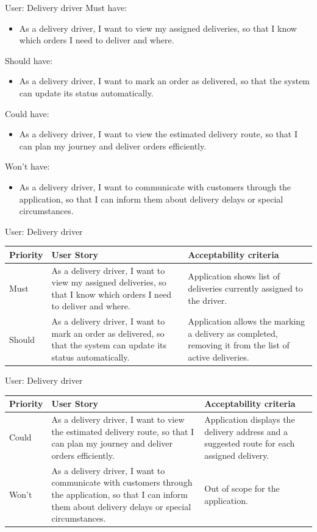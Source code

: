\documentclass{beamer}
\begin{document}
\begin{frame}{User: Delivery driver}
Must have:
\begin{itemize}
\item As a delivery driver, I want to view my assigned deliveries, so that I know which orders I need to deliver and where.
\end{itemize}
Should have:
\begin{itemize}
\item As a delivery driver, I want to mark an order as delivered, so that the system can update its status automatically.
\end{itemize}
Could have:
\begin{itemize}
\item As a delivery driver, I want to view the estimated delivery route, so that I can plan my journey and deliver orders efficiently.
\end{itemize}
Won't have:
\begin{itemize}
\item As a delivery driver, I want to communicate with customers through the application, so that I can inform them about delivery delays or special circumstances.
\end{itemize}
\end{frame}

\begin{frame}{User: Delivery driver}
\begin{tabular}{| l | p{4cm} | p{4cm} |}
\hline
Priority & User Story & Acceptability criteria \\
\hline
Must & As a delivery driver, I want to view my assigned deliveries, so that I know which orders I need to deliver and where.
     & Application shows list of deliveries currently assigned to the driver. \\
\hline
Should & As a delivery driver, I want to mark an order as delivered, so that the system can update its status automatically.
       & Application allows the marking a delivery as completed, removing it from the list of active deliveries. \\
\hline
\end{tabular}
\end{frame}

\begin{frame}{User: Delivery driver}
\begin{tabular}{| l | p{4cm} | p{4cm} |}
\hline
Priority & User Story & Acceptability criteria \\
\hline
Could & As a delivery driver, I want to view the estimated delivery route, so that I can plan my journey and deliver orders efficiently.
      & Application displays the delivery address and a suggested route for each assigned delivery. \\
\hline
Won't & As a delivery driver, I want to communicate with customers through the application, so that I can inform them about delivery delays or special circumstances.
      & Out of scope for the application. \\
\hline
\end{tabular}
\end{frame}
\end{document}
